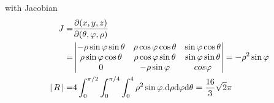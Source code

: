\documentclass[11pt]{amsbook}
\begin{document}
with Jacobian
\begin{align*}
	J=& \frac{\partial(x,y,z)}{\partial(\theta,\varphi,\rho)} \\
	=& 
	\begin{vmatrix}
		-\rho \sin\varphi \sin\theta & \rho \cos \varphi \cos \theta & \sin \varphi \cos \theta \\
		\rho \sin \varphi \cos \theta & \rho \cos \varphi \sin \theta & \sin \varphi \sin \theta \\
		0 & - \rho \sin \varphi & cos \varphi
	\end{vmatrix}
	= - \rho^2 \sin\varphi \\
	\left \lvert \, R \, \right \rvert =& 4 \int^{\pi/2}_0 \int^{\pi/4}_{0} \int^4_{0} \rho^2 \sin \varphi. \mathrm{d}{\rho} \mathrm{d}{\varphi} \mathrm{d}{\theta}  = \frac{16}{3} \sqrt{2} \pi
\end{align*}





















\end{document}
